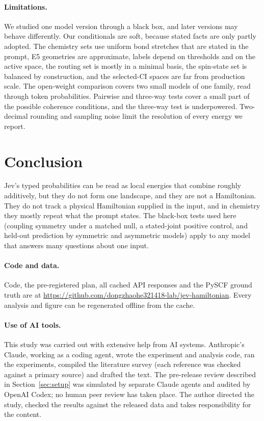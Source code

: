 \documentclass[11pt]{article}
\newcommand{\jev}{Jev}
\begin{document}
\paragraph{Limitations.}
We studied one model version through a black box, and later versions may behave differently.
Our conditionals are soft, because stated facts are only partly adopted.
The chemistry sets use uniform bond stretches that are stated in the prompt, E5 geometries are approximate, labels depend on thresholds and on the active space, the routing set is mostly in a minimal basis, the spin-state set is balanced by construction, and the selected-CI spaces are far from production scale. The open-weight comparison covers two small models of one family, read through token probabilities.
Pairwise and three-way tests cover a small part of the possible coherence conditions, and the three-way test is underpowered.
Two-decimal rounding and sampling noise limit the resolution of every energy we report.

\section{Conclusion}

\jev{}'s typed probabilities can be read as local energies that combine roughly additively, but they do not form one landscape, and they are not a Hamiltonian.
They do not track a physical Hamiltonian supplied in the input, and in chemistry they mostly repeat what the prompt states.
The black-box tests used here (coupling symmetry under a matched null, a stated-joint positive control, and held-out prediction by symmetric and asymmetric models) apply to any model that answers many questions about one input.

\paragraph{Code and data.}
Code, the pre-registered plan, all cached API responses and the PySCF ground truth are at \url{https://github.com/dongzhaohe321418-lab/jev-hamiltonian}.
Every analysis and figure can be regenerated offline from the cache.

\paragraph{Use of AI tools.}
This study was carried out with extensive help from AI systems. Anthropic's Claude, working as a coding agent, wrote the experiment and analysis code, ran the experiments, compiled the literature survey (each reference was checked against a primary source) and drafted the text. The pre-release review described in Section~\ref{sec:setup} was simulated by separate Claude agents and audited by OpenAI Codex; no human peer review has taken place. The author directed the study, checked the results against the released data and takes responsibility for the content.



\end{document}
